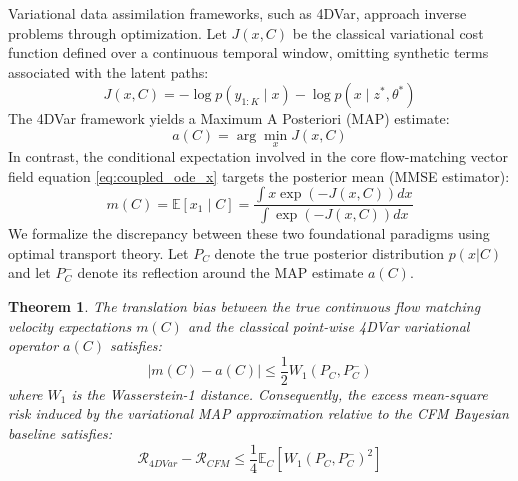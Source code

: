 \documentclass[10pt]{article}
\newtheorem{theorem}{Theorem}
\begin{document}
\iffalse
Variational data assimilation frameworks, such as 4DVar, approach inverse problems through optimization. Let $J(x, C)$ be the classical variational cost function defined over a continuous temporal window, omitting synthetic terms associated with the latent paths:
\begin{equation}
    J(x, C) = -\log p(y_{1:K} \mid x) - \log p(x \mid z^*, \theta^*)
\end{equation}
The 4DVar framework yields a Maximum A Posteriori (MAP) estimate:
\begin{equation}
    a(C) = \arg\min_{x} J(x, C) \label{eq:map_def}
\end{equation}
In contrast, the conditional expectation involved in the core flow-matching vector field equation \eqref{eq:coupled_ode_x} targets the posterior mean (MMSE estimator):
\begin{equation}
    m(C) = \mathbb{E}[x_1 \mid C] = \frac{\int x \exp(-J(x,C))dx}{\int \exp(-J(x,C))dx} \label{eq:mmse_def}
\end{equation}
We formalize the discrepancy between these two foundational paradigms using optimal transport theory. Let $P_{C}$ denote the true posterior distribution $p(x|C)$ and let $P_{C}^{-}$ denote its reflection around the MAP estimate $a(C)$.
\begin{theorem}
The translation bias between the true continuous flow matching velocity expectations $m(C)$ and the classical point-wise 4DVar variational operator $a(C)$ satisfies:
\begin{equation}
    |m(C) - a(C)| \le \frac{1}{2}W_{1}(P_{C}, P_{C}^{-}) \label{eq:w1_bound}
\end{equation}
where $W_{1}$ is the Wasserstein-1 distance. Consequently, the excess mean-square risk induced by the variational MAP approximation relative to the CFM Bayesian baseline satisfies:
\begin{equation}
    \mathcal{R}_{4DVar} - \mathcal{R}_{CFM} \le \frac{1}{4}\mathbb{E}_{C}[W_{1}(P_{C}, P_{C}^{-})^{2}]
\end{equation}
\end{theorem}
\end{document}
